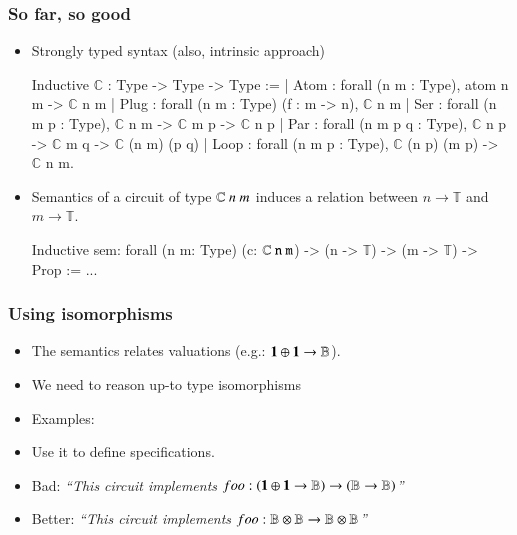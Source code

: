 \documentclass[9pt]{beamer}
\begin{document}
\newcommand\data{\mathbb{T}}

\begin{frame}[fragile]
  \frametitle{So far, so good}
  \begin{itemize}
  \item \alert{Strongly typed} syntax (also, \alert{intrinsic approach})
\begin{coq}
Inductive $\mathbb{C}$  : Type -> Type -> Type :=
| Atom : forall (n m : Type), atom n m -> $\mathbb{C}$ n m
| Plug : forall (n m : Type) (f : m -> n), $\mathbb{C}$ n m
| Ser   : forall (n m p : Type), $\mathbb{C}$ n m -> $\mathbb{C}$ m p -> $\mathbb{C}$ n p
| Par   : forall (n m p q : Type), $\mathbb{C}$ n p -> $\mathbb{C}$ m q ->  $\mathbb{C}$ (n \oplus m) (p \oplus q)
| Loop : forall (n m p : Type), $\mathbb{C}$ (n \oplus p) (m \oplus p) -> $\mathbb{C}$ n m.
\end{coq}       

\item   Semantics of a circuit of type $\mathbb{C}~n~m$ induces a \alert{relation} between $n
  \rightarrow \data$ and $m \rightarrow \data$.
  \begin{coq}
Inductive sem: forall (n m: Type) (c: $\mathbb{C}~\tt n~\tt m$) -> (n -> $\data$) -> (m -> $\data$) -> Prop := ...
\end{coq}
\end{itemize}
\end{frame}

\begin{frame}
  \frametitle{Using isomorphisms}

  \begin{itemize}
  \item The semantics relates \alert{valuations}   (e.g.: ${\bf 1} \oplus {\bf 1} \to \mathbb{B}$).
    \pause
  \item We need to reason \alert{up-to} type isomorphisms 
  \item Examples:
    \pause
  \item Use it to define specifications.
  \item Bad: {\em ``This circuit implements $foo: ({\bf 1} \oplus {\bf 1} \to \mathbb{B}) \to (\mathbb{B} \to \mathbb{B})$''}
  \item Better: {\em ``This circuit implements $foo: \mathbb{B} \otimes \mathbb{B} \to \mathbb{B} \otimes \mathbb{B}$''}
  \end{itemize}
\end{frame}
\end{document}
